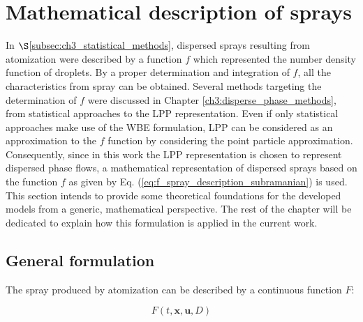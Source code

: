 


\section{Mathematical description of sprays}
	\label{sec:ch4_spray_description}

In $\S$\ref{subsec:ch3_statistical_methods}, dispersed sprays resulting from atomization were described by a function $f$ which represented the number density function of droplets. By a proper determination and integration of $f$, all the characteristics from spray can be obtained. Several methods targeting the determination of $f$ were discussed in Chapter \ref{ch3:disperse_phase_methods}, from statistical approaches to the LPP representation. Even if only statistical approaches make use of the WBE formulation, LPP can be considered as an approximation to the $f$ function by considering the point particle approximation. Consequently, since in this work the LPP representation is chosen to represent dispersed phase flows, a mathematical representation of dispersed sprays based on the function $f$ as given by Eq. (\ref{eq:f_spray_description_subramanian}) is used. This section intends to provide some theoretical foundations for the developed models from a generic, mathematical perspective. The rest of the chapter will be dedicated to explain how this formulation is applied in the current work. \\

\clearpage

\subsection{General formulation}

The spray produced by atomization can be described by a continuous function $F$:

\begin{equation}
F \left( t, \textbf{x}, \textbf{u}, D \right) 
\end{equation}

